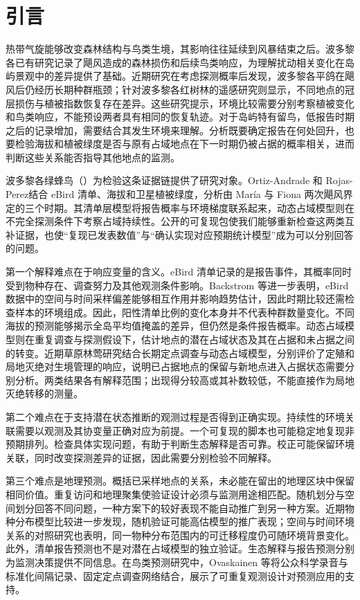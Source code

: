 \section{引言}
热带气旋能够改变森林结构与鸟类生境，其影响往往延续到风暴结束之后。波多黎各已有研究记录了飓风造成的森林损伤和后续鸟类响应，为理解扰动相关变化在岛屿景观中的差异提供了基础\cite{uriarte2019,wunderle1995}。近期研究在考虑探测概率后发现，波多黎各平鸽在飓风后仍经历长期种群瓶颈；针对波多黎各红树林的遥感研究则显示，不同地点的冠层损伤与植被指数恢复存在差异\cite{rivera2025,howe2025}。这些研究提示，环境比较需要分别考察植被变化和鸟类响应，不能预设两者具有相同的恢复轨迹。对于岛屿特有留鸟，低报告时期之后的记录增加，需要结合其发生环境来理解。分析既要确定报告在何处回升，也要检验海拔和植被绿度是否与原有占域地点在下一时期仍被占据的概率相关，进而判断这些关系能否指导其他地点的监测。

波多黎各绿蜂鸟（\Rm）为检验这条证据链提供了研究对象。Ortiz-Andrade 和 Rojas-Perez\cite{ortiz2026}结合 eBird 清单、海拔和卫星植被绿度，分析由 María 与 Fiona 两次飓风界定的三个时期。其清单层模型将报告概率与环境梯度联系起来，动态占域模型则在不完全探测条件下考察占域持续性。公开的可复现包使我们能够重新检查这两类互补证据，也使“复现已发表数值”与“确认实现对应预期统计模型”成为可以分别回答的问题。

第一个解释难点在于响应变量的含义。eBird 清单记录的是报告事件，其概率同时受到物种存在、调查努力及其他观测条件影响\cite{sullivan2009,johnston2021}。Backstrom 等\cite{backstrom2025}进一步表明，eBird 数据中的空间与时间采样偏差能够相互作用并影响趋势估计，因此时期比较还需检查样本的环境组成。因此，阳性清单比例的变化本身并不代表种群数量变化。不同海拔的预测能够揭示全岛平均值掩盖的差异，但仍然是条件报告概率。动态占域模型则在重复调查与探测假设下，估计地点的潜在占域状态及其在占据和未占据之间的转变\cite{mackenzie2002,mackenzie2003,guillera2017}。近期草原林莺研究结合长期定点调查与动态占域模型，分别评价了定殖和局地灭绝对生境管理的响应\cite{gordon2024}，说明已占据地点的保留与新地点进入占据状态需要分别分析。两类结果各有解释范围；出现得分较高或其补数较低，不能直接作为局地灭绝转移的测量。

第二个难点在于支持潜在状态推断的观测过程是否得到正确实现。持续性的环境关联需要以观测及其协变量正确对应为前提。一个可复现的脚本也可能稳定地复现非预期排列。检查具体实现问题，有助于判断生态解释是否可靠。校正可能保留环境关联，同时改变探测差异的证据，因此需要分别检验不同解释。

第三个难点是地理预测。概括已采样地点的关系，未必能在留出的地理区块中保留相同价值。重复访问和地理聚集使验证设计必须与监测用途相匹配\cite{roberts2017,valavi2019,ploton2020}。随机划分与空间划分回答不同问题，一种方案下的较好表现不能自动推广到另一种方案。近期物种分布模型比较进一步发现，随机验证可能高估模型的推广表现\cite{spacetime2025}；空间与时间环境关系的对照研究也表明，同一物种分布范围内的可迁移程度仍可随环境背景变化\cite{lovell2025}。此外，清单报告预测也不是对潜在占域模型的独立验证。生态解释与报告预测分别为监测决策提供不同信息\cite{elith2009}。在鸟类预测研究中，Ovaskainen 等\cite{ovaskainen2026}将公众科学录音与标准化间隔记录、固定定点调查网络结合，展示了可重复观测设计对预测应用的支持。

